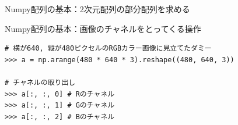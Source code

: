\documentclass[10pt]{beamer}
\begin{document}
\begin{frame}[fragile]{Numpy配列の基本：2次元配列の部分配列を求める}
\begin{center}
        \end{center}
	\end{frame}
	
    \begin{frame}[fragile]{Numpy配列の基本：画像のチャネルをとってくる操作}
        \begin{verbatim}
# 横が640, 縦が480ピクセルのRGBカラー画像に見立てたダミー
>>> a = np.arange(480 * 640 * 3).reshape((480, 640, 3))

# チャネルの取り出し
>>> a[:, :, 0] # Rのチャネル
>>> a[:, :, 1] # Gのチャネル
>>> a[:, :, 2] # Bのチャネル
        \end{verbatim}
	\end{frame}
    
\end{document}

